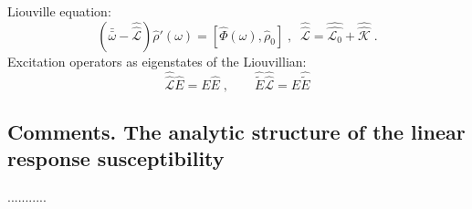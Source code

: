 \documentclass[reprint,aps,prb]{revtex4-1}
\newcommand{\dd}{{\rm d}}
\renewcommand{\r}{{\bf r}}
\newcommand{\bomega}{\bar\omega}
\newcommand{\bbomega}{\bar{\bomega}}
\newcommand{\be}{\begin{equation}}
\newcommand{\ee}{\end{equation}}
\newcommand{\qq}{\qquad}
\newcommand{\lb}{\label}
\newcommand{\op}[1]{\hat {#1}}
\newcommand{\sop}[1]{\op{\op {#1}}}
\newcommand{\commutator}[2]{\left[ {#1} , {#2} \right]}
\newcommand{\trace}[1]{\mathrm{tr}\left(#1\right)}
\newcommand{\dmnot}{\op{\rho}_0}
\newcommand{\dm}{\op{\rho}}
\newcommand{\hnot}{\op{H}_0}
\newcommand{\Liouv}{\sop{\mathcal L}}
\newcommand{\Liouvnot}{\sop{\mathcal L_0}}
\newcommand{\coupl}{\sop{\mathcal K}}
\begin{document}
Liouville equation:
\be\lb{LiouvillianRhopomegaDef1}
\left(\bbomega - \Liouv\right) \dm'(\omega) =  \commutator{\op\Phi(\omega)}{\dmnot}\;,\;\; 
\Liouv = \Liouvnot + \coupl \;.
\ee
Excitation operators as eigenstates of the Liouvillian:
\be
\Liouv \op E = E \op E \;, \qq
 \op{\tilde E} \Liouv = E \op{\tilde E}
\ee

\subsection{Comments. The analytic structure of the linear response susceptibility}

...........



\end{document}
